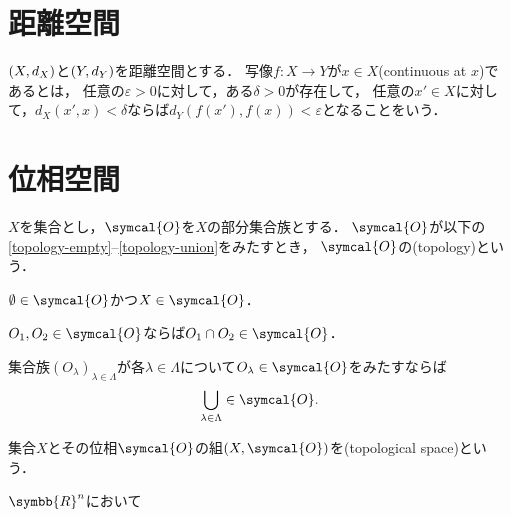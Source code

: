 \documentclass{ltjsbook}
\begin{document}
\nocite{uchida}
\nocite{introduction-to-topology}

\section{距離空間}
\begin{thmbox}
\begin{definition}
\((X, d_{X})\)と\((Y, d_{Y})\)を距離空間とする．
写像\(f\colon X \to Y\)が\(x \in X\)(continuous at \(x\))であるとは，
任意の\(\varepsilon > 0\)に対して，ある\(\delta > 0\)が存在して，
任意の\(x' \in X\)に対して，\(d_{X}(x', x) < \delta\)ならば\(d_{Y}(f(x'), f(x)) < \varepsilon\)となることをいう．
\end{definition}
\end{thmbox}

\section{位相空間}
\begin{thmbox}
\begin{definition}
\(X\)を集合とし，\(\symcal{O}\)を\(X\)の部分集合族とする．
\(\symcal{O}\)が以下の\ref{topology-empty}--\ref{topology-union}をみたすとき，
\(\symcal{O}\)の(topology)という．
\begin{conditions}
    \item\label{topology-empty} \(\emptyset \in \symcal{O}\)かつ\(X \in \symcal{O}\)．
    \item\label{topology-intersection} \(O_1, O_2 \in \symcal{O}\)ならば\(O_1 \cap O_2 \in \symcal{O}\)．
    \item\label{topology-union} 集合族\({(O_\lambda)}_{\lambda \in \Lambda}\)が各\(\lambda \in \Lambda\)について\(O_\lambda \in \symcal{O}\)をみたすならば
        \begin{align}
            \bigcup_{\lambda \in \Lambda} \in \symcal{O}.
        \end{align}
\end{conditions}
集合\(X\)とその位相\(\symcal{O}\)の組\(\tuple{X, \symcal{O}}\)を(topological space)という．
\end{definition}
\end{thmbox}

\begin{thmbox}
\begin{definition}
\(\symbb{R}^n\)において
\end{definition}
\end{thmbox}
\end{document}
